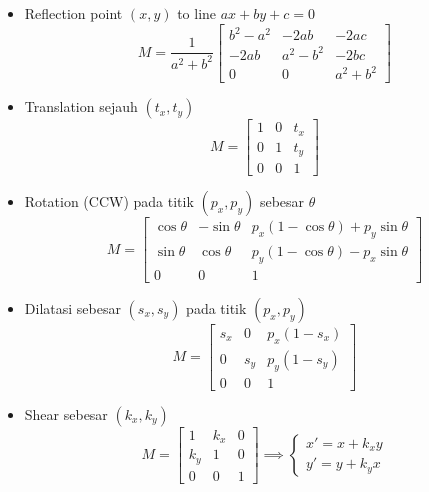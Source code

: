 \begin{itemize}
    \item Reflection point $(x, y)$ to line $ax+by+c = 0$
    \[
        M = \frac{1}{a^2 + b^2}
        \begin{bmatrix}
            b^2 - a^2 & -2ab & -2ac \\
            -2ab & a^2 - b^2 & -2bc \\
            0 & 0 & a^2 + b^2
        \end{bmatrix}
    \]

    \item Translation sejauh $(t_{x}, t_{y})$
    \[
        M = 
        \begin{bmatrix}
            1 & 0 & t_x \\
            0 & 1 & t_y \\
            0 & 0 & 1
        \end{bmatrix}
    \]

    \item Rotation (CCW) pada titik $(p_x, p_y)$ sebesar $\theta$
    \[
        M = 
        \begin{bmatrix}
            \cos\theta & -\sin\theta & p_x(1 - \cos\theta) + p_y\sin\theta \\
            \sin\theta & \cos\theta & p_y(1 - \cos\theta) - p_x\sin\theta \\
            0 & 0 & 1
        \end{bmatrix}
    \]

    \item Dilatasi sebesar $(s_x, s_y)$ pada titik $(p_x, p_y)$
    \[
        M = 
        \begin{bmatrix}
            s_x & 0 & p_x(1 - s_x) \\
            0 & s_y & p_y(1 - s_y) \\
            0 & 0 & 1
        \end{bmatrix}
    \]

    \item Shear sebesar $(k_x, k_y)$
    \[
        M = 
        \begin{bmatrix}
            1 & k_x & 0 \\
            k_y & 1 & 0 \\
            0 & 0 & 1
        \end{bmatrix}
        \implies
        \begin{cases}
            x' = x + k_x y \\
            y' = y + k_y x
        \end{cases}
    \]


\end{itemize}
